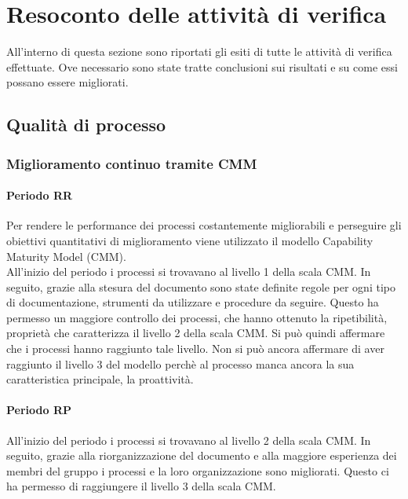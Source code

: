 \documentclass[PdQ.tex]{subfiles}
\begin{document}
\section{Resoconto delle attività di verifica}
All'interno di questa sezione sono riportati gli esiti di tutte le attività di verifica effettuate. Ove necessario sono state tratte conclusioni sui risultati e su come essi possano essere migliorati.

\subsection{Qualità di processo}
	\subsubsection{Miglioramento continuo tramite CMM}
		\paragraph{Periodo RR}
		Per rendere le performance dei processi costantemente migliorabili e perseguire gli obiettivi quantitativi di miglioramento viene utilizzato il modello Capability Maturity Model (CMM).\\
		All'inizio del periodo i processi si trovavano al livello 1 della scala CMM. In seguito, grazie alla stesura del documento \NPdocRR{} sono state definite regole per ogni tipo di documentazione, strumenti da utilizzare e procedure da seguire. Questo ha permesso un maggiore controllo dei processi, che hanno ottenuto la ripetibilità, proprietà che caratterizza il livello 2 della scala CMM. Si può quindi affermare che i processi hanno raggiunto tale livello. Non si può ancora affermare di aver raggiunto il livello 3 del modello perchè al processo manca ancora la sua caratteristica principale, la proattività.\\

\paragraph{Periodo RP}
	
		All'inizio del periodo i processi si trovavano al livello 2 della scala CMM. In seguito, grazie alla riorganizzazione del documento \NPdocRP{} e alla maggiore esperienza dei membri del gruppo i processi e la loro organizzazione sono migliorati. Questo ci ha permesso di raggiungere il livello 3 della scala CMM. 	
	
\end{document}

